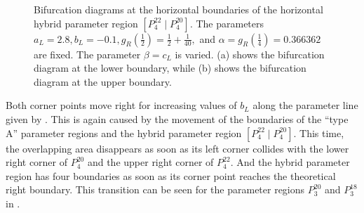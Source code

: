 \begin{figure}
	\centering
	\caption[Bifurcation diagrams for the horizontal hybrid parameter regions in the increasing archetypal model]{
		Bifurcation diagrams at the horizontal boundaries of the horizontal hybrid parameter region $\left[P^{22}_4 \mid P^{20}_4\right]$.
		The parameters $a_L = 2.8, b_L = -0.1, g_R\left(\frac{1}{2}\right) = \frac{1}{2} + \frac{1}{40},$ and $\alpha = g_R\left(\frac{1}{4}\right) = 0.366362$ are fixed.
		The parameter $\beta = c_L$ is varied.
		(a) shows the bifurcation diagram at the lower boundary, while (b) shows the bifurcation diagram at the upper boundary.
	}
	\label{fig:add.change.appa.hor.bif}
\end{figure}

Both corner points move right for increasing values of $b_L$ along the parameter line given by .
This is again caused by the movement of the boundaries of the ``type A'' parameter regions and the hybrid parameter region $\left[P^{22}_4 \mid P^{20}_4\right]$.
This time, the overlapping area disappears as soon as its left corner collides with the lower right corner of $P^{20}_4$ and the upper right corner of $P^{22}_4$.
And the hybrid parameter region has four boundaries as soon as its corner point reaches the theoretical right boundary.
This transition can be seen for the parameter regions $P^{20}_3$ and $P^{18}_3$ in .


